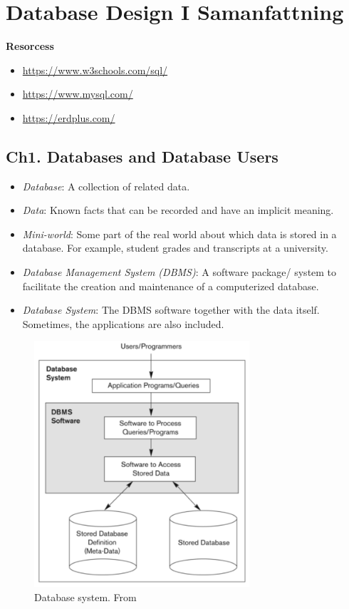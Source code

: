 \chapter{Database Design I Samanfattning}

\textbf{Resorcess}
\begin{itemize}
    \item \url{https://www.w3schools.com/sql/}
    \item \url{https://www.mysql.com/}
    \item \url{https://erdplus.com/}
\end{itemize}


\newpage
\begin{multicols}{2}
\section{Ch1. Databases and Database Users}
\begin{itemize}
    \item \textit{Database}: A collection of related data.
    \item \textit{Data}: Known facts that can be recorded and have an implicit meaning.
    \item \textit{Mini-world}: Some part of the real world about which data is stored 
    in a database. For example, student grades and transcripts at a university.
    \item \textit{Database Management System (DBMS)}: A software package/ system to 
    facilitate the creation and maintenance of a computerized database.
    \item \textit{Database System}: The DBMS software together with the data itself. 
    Sometimes, the applications are also included.
\end{itemize}

\begin{figure}[H]
    \centering
    \includegraphics[width=8cm]{image/database-system.pdf}
    \caption{Database system. From \cite{dd}}
\end{figure}


\end{multicols}

